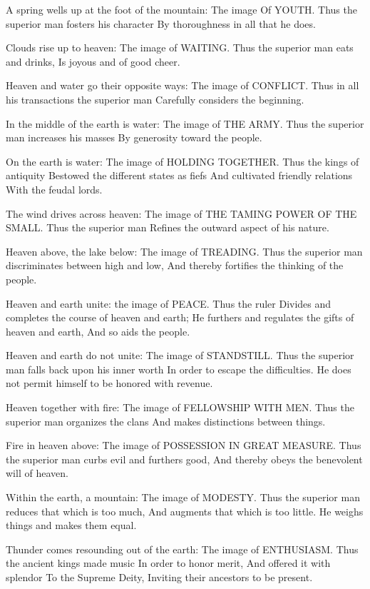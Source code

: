 {A spring wells up at the foot of the mountain:
 The image Of YOUTH.
 Thus the superior man fosters his character
 By thoroughness in all that he does.}

{Clouds rise up to heaven:
 The image of WAITING.
 Thus the superior man eats and drinks,
 Is joyous and of good cheer.}

{Heaven and water go their opposite ways:
 The image of CONFLICT.
 Thus in all his transactions the superior man
 Carefully considers the beginning.}

{In the middle of the earth is water:
 The image of THE ARMY.
 Thus the superior man increases his masses
 By generosity toward the people.}

{On the earth is water:
 The image of HOLDING TOGETHER.
 Thus the kings of antiquity
 Bestowed the different states as fiefs
 And cultivated friendly relations
 With the feudal lords.}

{The wind drives across heaven:
 The image of THE TAMING POWER OF THE SMALL.
 Thus the superior man
 Refines the outward aspect of his nature.}

{Heaven above, the lake below:
 The image of TREADING.
 Thus the superior man discriminates between high and low,
 And thereby fortifies the thinking of the people.}

{Heaven and earth unite: the image of PEACE.
 Thus the ruler
 Divides and completes the course of heaven and earth;
 He furthers and regulates the gifts of heaven and earth,
 And so aids the people.}

{Heaven and earth do not unite:
 The image of STANDSTILL.
 Thus the superior man falls back upon his inner worth
 In order to escape the difficulties.
 He does not permit himself to be honored with revenue.}

{Heaven together with fire:
 The image of FELLOWSHIP WITH MEN.
 Thus the superior man organizes the clans
 And makes distinctions between things.}

{Fire in heaven above:
 The image of POSSESSION IN GREAT
 MEASURE.
 Thus the superior man curbs evil and furthers good,
 And thereby obeys the benevolent will of heaven.}

{Within the earth, a mountain:
 The image of MODESTY.
 Thus the superior man reduces that which is too much,
 And augments that which is too little.
 He weighs things and makes them equal.}

{Thunder comes resounding out of the earth:
 The image of ENTHUSIASM.
 Thus the ancient kings made music
 In order to honor merit,
 And offered it with splendor
 To the Supreme Deity,
 Inviting their ancestors to be present.}

